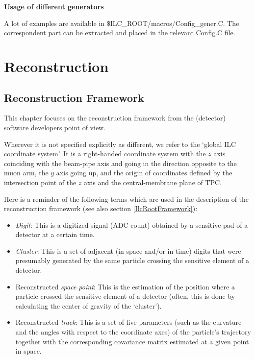 \documentclass[12pt,a4paper,twoside]{article}
\begin{document}
\noindent
\textbf{Usage of different generators}

A lot of examples are available in
\$ILC\_ROOT/macros/Config\_gener.C. The correspondent part can be
extracted and placed in the relevant Config.C file.




\newpage 
\section{Reconstruction}


\subsection{Reconstruction Framework}

This chapter
focuses on the reconstruction framework from the (detector) software
developers point of view. 

Wherever it is not specified explicitly as different,  we refer 
to the `global ILC coordinate system'\cite{CoordinateSystem}. It is a right-handed coordinate
system with
the $z$ axis coinciding with the beam-pipe axis and going in the direction 
opposite to the muon arm, the $y$ axis going up, and the origin of
coordinates defined by the intersection point of the $z$ axis 
and the central-membrane plane of TPC.

Here is a reminder of the following terms which are used in the
description of the reconstruction framework (see also section \ref{IlcRootFramework}):
\begin{itemize}
\item {\it Digit}: This is a digitized signal (ADC count) obtained by 
  a sensitive pad of a detector at a certain time.
\item {\it Cluster}: This is a set of adjacent (in space and/or in time)
  digits that were presumably generated by the same particle crossing the 
  sensitive element of a detector.
\item Reconstructed {\it space point}: This is the estimation of the
  position where a particle crossed the sensitive element of a detector
  (often, this is done by calculating the center of gravity of the
  `cluster').
\item Reconstructed {\it track}: This is a set of five parameters (such as the
  curvature and the angles with respect to the coordinate axes) of the particle's
  trajectory together with the corresponding covariance matrix estimated at a given
  point in space.

\end{itemize}
\end{document}
